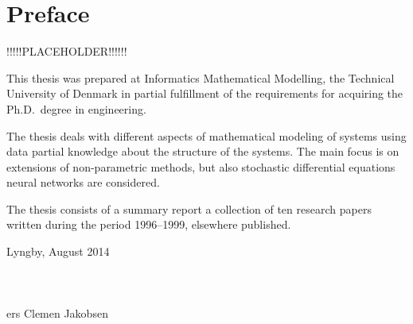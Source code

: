 \chapter{Preface}

!!!!!PLACEHOLDER!!!!!!

This thesis was prepared at Informatics Mathematical Modelling,
the Technical University of Denmark in partial fulfillment of the
requirements for acquiring the Ph.D.\ degree in engineering.

The thesis deals with different aspects of mathematical modeling of
systems using data partial knowledge about the structure of the
systems.  The main focus is on extensions of non-parametric methods,
but also stochastic differential equations neural networks are
considered.

The thesis consists of a summary report a collection of ten
research papers written during the period 1996--1999, elsewhere
published.

\vspace{20mm}
\mbox{}\hfill
\begin{minipage}[t]{80mm}
  Lyngby, August 2014
  \\ \\ \\ \\
 ers Clemen Jakobsen
\end{minipage}
